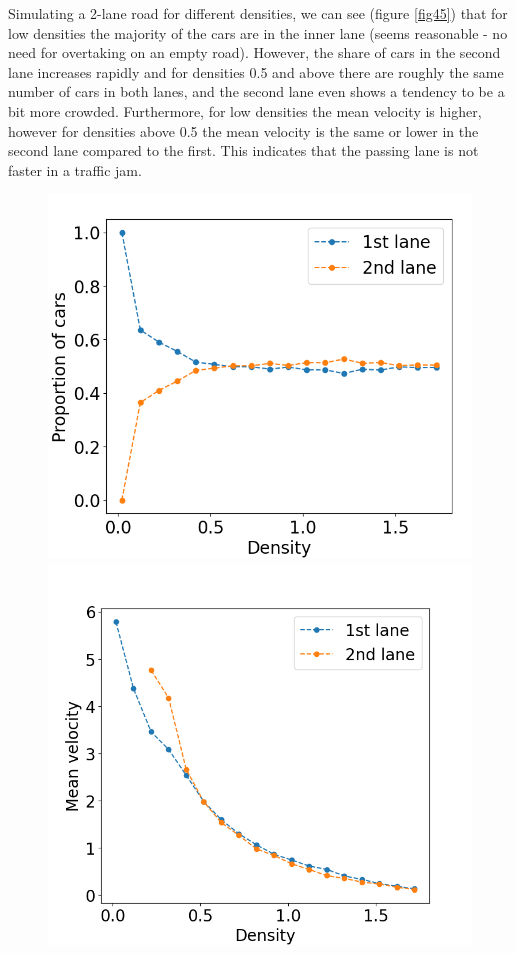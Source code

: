 \documentclass[a4paper,12pt]{article}
\begin{document}
Simulating a 2-lane road for different densities, we can see (figure \ref{fig45}) that for low densities the majority of the cars are in the inner lane (seems reasonable - no need for overtaking on an empty road). However, the share of cars in the second lane increases rapidly and for densities 0.5 and above there are roughly the same number of cars in both lanes, and the second lane even shows a tendency to be a bit more crowded. Furthermore, for low densities the mean velocity is higher, however for densities above 0.5 the mean velocity is the same or lower in the second lane compared to the first. This indicates that the passing lane is not faster in a traffic jam. 
\begin{figure}[H]
	 \centering
    \begin{minipage}{.5\textwidth}
        \centering
        \includegraphics[scale=0.37]{fig5.png}
    \end{minipage}%
    \begin{minipage}{.5\textwidth}
        \centering
        \includegraphics[scale=0.37]{fig4.png}

\end{minipage}
\end{figure}
\end{document}
